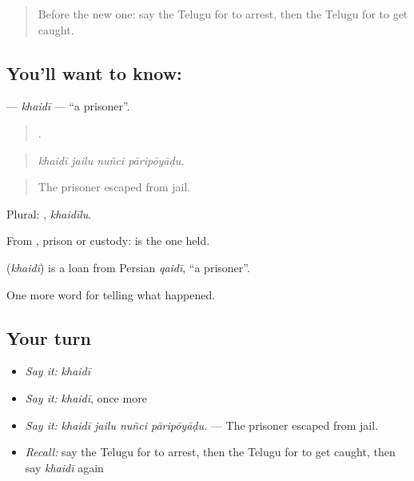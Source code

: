 \label{lesson:TE-C337-khaidi}



\begin{quote}
Before the new one: say the Telugu for to arrest, then the Telugu for to get caught.
\end{quote}

\subsection*{You'll want to know: }
\textbf{} — \emph{khaidī} — \textquotedblleft{}a prisoner\textquotedblright{}.

\begin{quote}
   .
\end{quote}

\begin{quote}
\emph{khaidī jailu nuñci pāripōyāḍu.}
\end{quote}

\begin{quote}
The prisoner escaped from jail.
\end{quote}

Plural: , \emph{khaidīlu}.

From , prison or custody:  is the one held.

\begin{cousinweb}
\textbf{} (\emph{khaidī}) is a loan from Persian \emph{qaidī}, \textquotedblleft{}a prisoner\textquotedblright{}.
\end{cousinweb}

\begin{grammarlens}[title={What you've built}]
One more word for telling what happened.
\end{grammarlens}

\subsection*{Your turn}
\begin{itemize}
\raggedright
  \item \emph{Say it:} \emph{khaidī}
  \item \emph{Say it:} \emph{khaidī}, once more
  \item \emph{Say it:} \emph{khaidī jailu nuñci pāripōyāḍu.} — The prisoner escaped from jail.
  \item \emph{Recall:} say the Telugu for to arrest, then the Telugu for to get caught, then say \emph{khaidī} again
\end{itemize}

